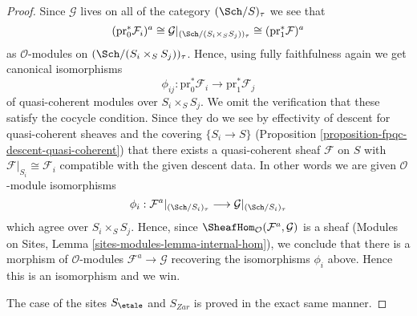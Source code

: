\begin{proof}
\medskip\noindent
Since $\mathcal{G}$ lives on all of the category
$(\Sch/S)_\tau$ we see that
$$
(\text{pr}_0^*\mathcal{F}_i)^a
\cong
\mathcal{G}|_{(\Sch/(S_i \times_S S_j))_\tau}
\cong
(\text{pr}_1^*\mathcal{F})^a
$$
as $\mathcal{O}$-modules on $(\Sch/(S_i \times_S S_j))_\tau$.
Hence, using fully faithfulness again we get canonical isomorphisms
$$
\phi_{ij} :
\text{pr}_0^*\mathcal{F}_i
\longrightarrow
\text{pr}_1^*\mathcal{F}_j
$$
of quasi-coherent modules over $S_i \times_S S_j$. We omit the verification
that these satisfy the cocycle condition. Since they do we see by
effectivity of descent for quasi-coherent sheaves and the covering
$\{S_i \to S\}$ (Proposition \ref{proposition-fpqc-descent-quasi-coherent})
that there exists a quasi-coherent sheaf $\mathcal{F}$ on $S$
with $\mathcal{F}|_{S_i} \cong \mathcal{F}_i$ compatible
with the given descent data. In other words we are given
$\mathcal{O}$-module isomorphisms
$$
\phi_i :
\mathcal{F}^a|_{(\Sch/S_i)_\tau}
\longrightarrow
\mathcal{G}|_{(\Sch/S_i)_\tau}
$$
which agree over $S_i \times_S S_j$. Hence, since
$\SheafHom_\mathcal{O}(\mathcal{F}^a, \mathcal{G})$ is
a sheaf (Modules on Sites, Lemma \ref{sites-modules-lemma-internal-hom}),
we conclude that
there is a morphism of $\mathcal{O}$-modules $\mathcal{F}^a \to \mathcal{G}$
recovering the isomorphisms $\phi_i$ above. Hence this is an isomorphism
and we win.

\medskip\noindent
The case of the sites $S_\etale$ and $S_{Zar}$ is proved in the
exact same manner.
\end{proof}

